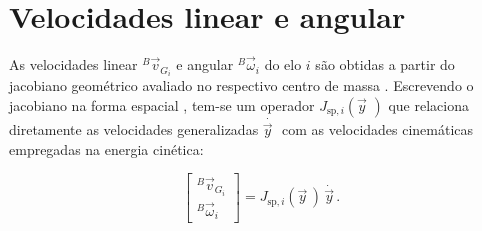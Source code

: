 






\section{Velocidades linear e angular}
\label{sec_dinAcoplada_veloc_linear_angular}

As velocidades linear ${}^{B}\!\vec v_{G_i}$ e angular ${}^{B}\!\vec\omega_i$
do elo $i$ são obtidas a partir do jacobiano geométrico avaliado no respectivo
centro de massa \cite{craig2005,Wang2003KinematicsDynamics}.
Escrevendo o jacobiano na forma espacial \cite{murray1994mathematical},
tem-se um operador $J_{\text{sp},i}(\vec y\, \, )$ que
relaciona diretamente as velocidades generalizadas
$\dot{\vec y\, \, }$ com as velocidades cinemáticas empregadas na energia
cinética:

\begin{equation}
\begin{bmatrix}
{}^{B}\!\vec v_{G_i} \\
{}^{B}\!\vec\omega_i
\end{bmatrix}
=
J_{\text{sp},i}(\vec y\,)\,\dot{\vec y\,}.
\label{eq_jacobianos_vGi1}
\end{equation}

